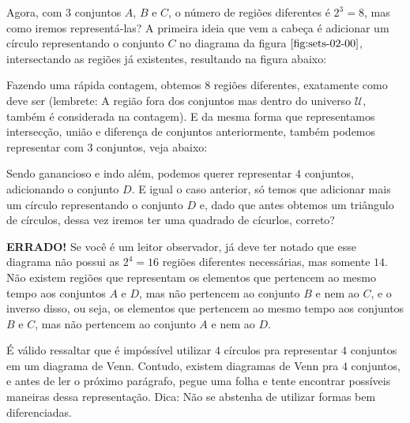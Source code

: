   Agora, com $3$ conjuntos $A$, $B$ e $C$, o número de regiões diferentes é $2^3=8$, mas como iremos representá-las? A primeira ideia que vem a cabeça é adicionar um círculo representando o conjunto $C$ no diagrama da figura $\ref{fig:sets-02-00}$, intersectando as regiões já existentes, resultando na figura abaixo:

  Fazendo uma rápida contagem, obtemos $8$ regiões diferentes, exatamente como deve ser (lembrete: A região fora dos conjuntos mas dentro do universo $\mathcal U$, também é considerada na contagem). E da mesma forma que representamos intersecção, união e diferença de conjuntos anteriormente, também podemos representar com $3$ conjuntos, veja abaixo:




  Sendo ganancioso e indo além, podemos querer representar $4$ conjuntos, adicionando o conjunto $D$. E igual o caso anterior, só temos que adicionar mais um círculo representando o conjunto $D$ e, dado que antes obtemos um triângulo de círculos, dessa vez iremos ter uma quadrado de cícurlos, correto?

  \textbf{ERRADO!} Se você é um leitor observador, já deve ter notado que esse diagrama não possui as $2^4=16$ regiões diferentes necessárias, mas somente $14$. Não existem regiões que representam os elementos que pertencem ao mesmo tempo aos conjuntos $A$ e $D$, mas não pertencem ao conjunto $B$ e nem ao $C$, e o inverso disso, ou seja, os elementos que pertencem ao mesmo tempo aos conjuntos $B$ e $C$, mas não pertencem ao conjunto $A$ e nem ao $D$.

  É válido ressaltar que é impóssível utilizar $4$ círculos pra representar $4$ conjuntos em um diagrama de Venn. Contudo, existem diagramas de Venn pra $4$ conjuntos, e antes de ler o próximo parágrafo, pegue uma folha e tente encontrar possíveis maneiras dessa representação. Dica: Não se abstenha de utilizar formas bem diferenciadas.

